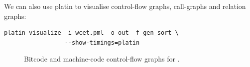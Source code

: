 We can also use platin to visualise control-flow graphs, call-graphs and relation graphs:

\begin{verbatim}
platin visualize -i wcet.pml -o out -f gen_sort \
                 --show-timings=platin
\end{verbatim}

\begin{figure}[!ht]
  \centering
  \quad
  \caption{Bitcode and machine-code control-flow graphs for .}
  \label{fig:platin:cfg}
\end{figure}
